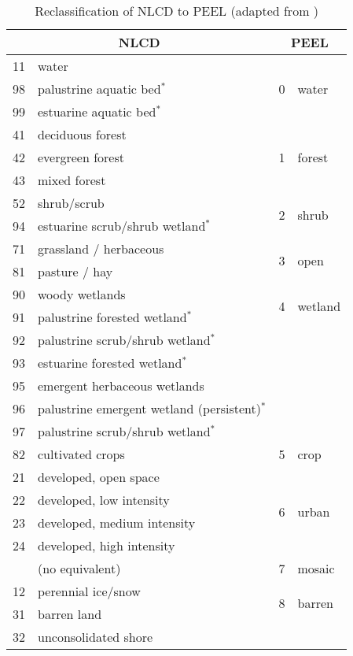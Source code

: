 \begin{center}
  \begin{table}[htbp]
    \begin{tabular}{|l|l|l|l|}
      \hline
      \multicolumn{2}{|c|}{NLCD} & \multicolumn{2}{|c|}{PEEL} \\
      \hline
      11 & water & \multirow{3}{*}{0} & \multirow{3}{*}{water} \\
      98 & palustrine aquatic bed$^*$ & & \\
      99 & estuarine aquatic bed$^*$ & & \\
      \hline
      41 & deciduous forest & \multirow{3}{*}{1} & \multirow{3}{*}{forest} \\
      42 & evergreen forest & & \\
      43 & mixed forest & & \\
      \hline
      52 & shrub/scrub & \multirow{2}{*}{2} & \multirow{2}{*}{shrub} \\
      94 & estuarine scrub/shrub wetland$^*$ & & \\
      \hline
      71 & grassland / herbaceous & \multirow{2}{*}{3} & \multirow{2}{*}{open} \\
      81 & pasture / hay & & \\
      \hline
      90 & woody wetlands & \multirow{2}{*}{4} & \multirow{2}{*}{wetland} \\
      91 & palustrine forested wetland$^*$ & & \\
      92 & palustrine scrub/shrub wetland$^*$ & & \\
      93 & estuarine forested wetland$^*$ & & \\
      95 & emergent herbaceous wetlands & & \\
      96 & palustrine emergent wetland (persistent)$^*$ & & \\
      97 & palustrine scrub/shrub wetland$^*$ & & \\
      \hline
      82 & cultivated crops & 5 & crop \\
      \hline
      21 & developed, open space & \multirow{4}{*}{6} & \multirow{4}{*}{urban} \\
      22 & developed, low intensity & & \\
      23 & developed, medium intensity & & \\
      24 & developed, high intensity & & \\
      \hline
       & (no equivalent) & 7 & mosaic \\
      \hline
      12 & perennial ice/snow & \multirow{2}{*}{8} & \multirow{2}{*}{barren} \\
      31 & barren land & & \\  
      32 & unconsolidated shore & & \\  
      \hline
    \end{tabular}
    \caption{Reclassification of NLCD to PEEL (adapted from \citet{Homer2004})}
    \label{tab:nlcd_reclass}
  \end{table}
\end{center}

